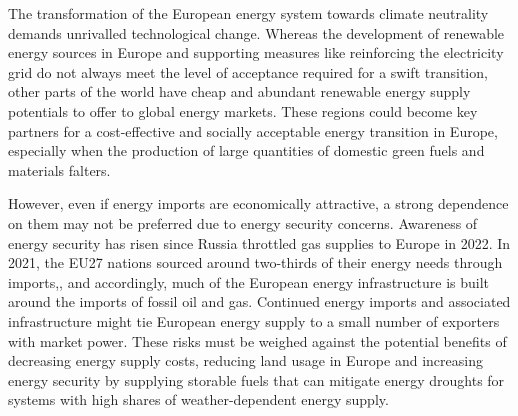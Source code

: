 

The transformation of the European energy system towards climate neutrality
demands unrivalled technological change. 
Whereas the development of renewable
energy sources in Europe and supporting measures like reinforcing the
electricity grid do not always meet the level of acceptance required for a swift
transition, other parts of the world have cheap and abundant renewable energy
supply potentials to offer to global energy
markets.\cite{irenaGlobalHydrogen2022,luxSupplyCurves2021,vanderzwaanTimmermansDream2021,fasihiLongTermHydrocarbon2017,reichenbergDeepDecarbonization2022,galvanExportingSunshine2022,armijoFlexibleProduction2020,pfennigGlobalGISbased2022}
These regions could become key partners for a cost-effective and socially
acceptable energy transition in Europe, especially when the production of large
quantities of domestic green fuels and materials falters.


However, even if energy imports are economically attractive, a strong dependence
on them may not be preferred due to energy security concerns.  Awareness of
energy security has risen since Russia throttled gas supplies to Europe in
2022.\cite{pedersenLongtermImplications2022} In 2021, the EU27 nations sourced
around two-thirds of their energy needs through
imports,\cite{eurostatCompleteEnergy2023}, and accordingly, much of the European
energy infrastructure is built around the imports of fossil oil and gas.
Continued energy imports and associated infrastructure might tie European energy
supply to a small number of exporters with market power. These risks
must be weighed against the potential benefits of decreasing energy supply
costs, reducing land usage in Europe and increasing energy security by supplying
storable fuels that can mitigate energy droughts for systems with high shares of
weather-dependent energy supply.

